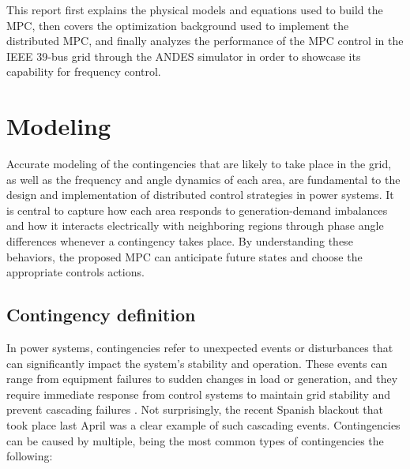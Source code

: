 \documentclass{article}
\begin{document}
This report first explains the physical models and equations used to build the MPC, then covers the optimization background used to implement the distributed MPC, and finally analyzes the performance of the MPC control in the IEEE 39-bus grid through the ANDES simulator in order to showcase its capability for frequency control.

\newpage
\section{Modeling}
Accurate modeling of the contingencies that are likely to take place in the grid, as well as the frequency and angle dynamics of each area, are fundamental to the design and implementation of distributed control strategies in power systems. It is central to capture how each area responds to generation-demand imbalances and how it interacts electrically with neighboring regions through phase angle differences whenever a contingency takes place. By understanding these behaviors, the proposed MPC can anticipate future states and choose the appropriate controls actions.

\subsection{Contingency definition}
In power systems, contingencies refer to unexpected events or disturbances that can significantly impact the system's stability and operation. These events can range from equipment failures to sudden changes in load or generation, and they require immediate response from control systems to maintain grid stability and prevent cascading failures \cite{contingency:analysis}. Not surprisingly, the recent Spanish blackout that took place last April was a clear example of such cascading events. Contingencies can be caused by multiple, being the most common types of contingencies the following:
\end{document}
